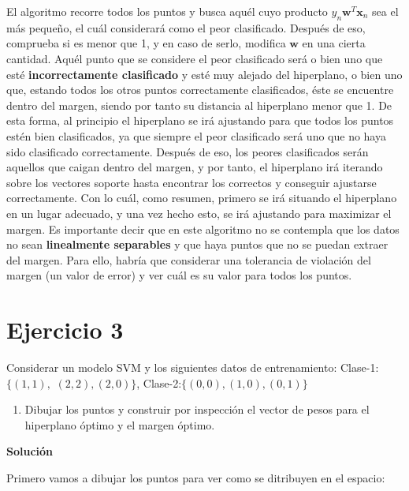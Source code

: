 \documentclass[11pt,a4paper]{article}
\newcommand{\answer}{\noindent\textbf{Solución}}
\newcommand{\addtoc}[1]{\addcontentsline{toc}{section}{#1}}
\begin{document}
El algoritmo recorre todos los puntos y busca aquél cuyo producto $y_n\mathbf{w}^T\mathbf{x}_n$ sea el más pequeño, el cuál
considerará como el peor clasificado. Después de eso, comprueba si es menor que 1, y en caso de serlo, modifica $\mathbf{w}$ en una
cierta cantidad. Aquél punto que se considere el peor clasificado será o bien uno que esté \textbf{incorrectamente clasificado} y esté
muy alejado del hiperplano, o bien uno que, estando todos los otros puntos correctamente clasificados, éste se encuentre dentro del
margen, siendo por tanto su distancia al hiperplano menor que 1. De esta forma, al principio el hiperplano se irá ajustando para
que todos los puntos estén bien clasificados, ya que siempre el peor clasificado será uno que no haya sido clasificado correctamente.
Después de eso, los peores clasificados serán aquellos que caigan dentro del margen, y por tanto, el hiperplano irá iterando sobre
los vectores soporte hasta encontrar los correctos y conseguir ajustarse correctamente. Con lo cuál, como resumen, primero se irá
situando el hiperplano en un lugar adecuado, y una vez hecho esto, se irá ajustando para maximizar el margen. Es importante decir que
en este algoritmo no se contempla que los datos no sean \textbf{linealmente separables} y que haya puntos que no se puedan extraer del
margen. Para ello, habría que considerar una tolerancia de violación del margen (un valor de error) y ver cuál es su valor para todos
los puntos.


\section*{Ejercicio 3}
\addtoc{Ejercicio 3}

\noindent Considerar un modelo SVM y los siguientes datos de entrenamiento: Clase-1:$\lbrace (1,1),$
$(2,2),(2,0) \rbrace$, Clase-2:$\lbrace (0,0),(1,0),(0,1) \rbrace$

\begin{enumerate}[label=\textit{\alph*})]
	\item Dibujar los puntos y construir por inspección el vector de pesos para el hiperplano óptimo y el margen óptimo.
\end{enumerate}

\answer

Primero vamos a dibujar los puntos para ver como se ditribuyen en el espacio:
\end{document}
